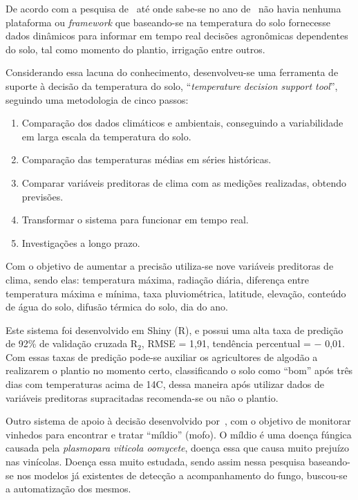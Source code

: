 \documentclass[
article,			%
12pt,				%
oneside,			%
a4paper,			%
english,			%
brazil,				%
sumario=tradicional
]{abntex2}
\begin{document}



De acordo com a pesquisa de~\citeauthor{1} até onde sabe-se no ano de~\citeyear{1} não havia nenhuma plataforma ou \textit{framework} que baseando-se na temperatura do solo fornecesse dados dinâmicos para informar em tempo real decisões agronômicas dependentes do solo, tal como momento do plantio, irrigação entre outros.

Considerando essa lacuna do conhecimento, desenvolveu-se uma ferramenta de suporte à decisão da temperatura do solo, ``\textit{temperature decision support tool}'', seguindo uma metodologia de cinco passos:
\begin{enumerate}
  \item Comparação dos dados climáticos e ambientais, conseguindo a variabilidade em larga escala da temperatura do solo.

  \item Comparação das temperaturas médias em séries históricas.
  \item Comparar variáveis preditoras de clima com as medições realizadas, obtendo previsões.
  \item Transformar o sistema para funcionar em tempo real.
  \item Investigações a longo prazo.
\end{enumerate}

Com o objetivo de aumentar a precisão utiliza-se nove variáveis preditoras de clima, sendo elas: temperatura máxima, radiação diária, diferença entre temperatura máxima e mínima, taxa pluviométrica, latitude, elevação, conteúdo de água do solo, difusão térmica do solo, dia do ano.

Este sistema foi desenvolvido em Shiny (R), e possui uma alta taxa de predição de 92\% de validação cruzada R$_{2}$, RMSE = 1,91, tendência percentual = $-$ 0,01.
Com essas taxas de predição pode-se auxiliar os agricultores de algodão a realizarem o plantio no momento certo, classificando o solo como ``bom'' após três dias com temperaturas acima de 14\textdegree C, dessa maneira após utilizar dados de variáveis preditoras supracitadas recomenda-se ou não o plantio.

Outro sistema de apoio à decisão desenvolvido por~\citeauthor{2}, com o objetivo de monitorar vinhedos para encontrar e tratar ``míldio'' (mofo).
O míldio é uma doença fúngica causada pela \textit{plasmopara viticola oomycete}, doença essa que causa muito prejuízo nas vinícolas\cite{2}. Doença essa muito estudada, sendo assim nessa pesquisa baseando-se nos modelos já existentes de detecção a acompanhamento do fungo, buscou-se a automatização dos mesmos.
\end{document}
